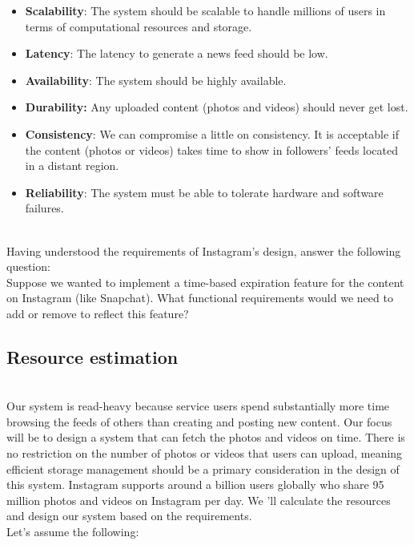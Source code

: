 \begin{itemize}
\item
\protect{}\label{AerSNzIcYi7g0HI8k8qSz}
\textbf{Scalability}: The system should be scalable to handle millions of users in terms of computational resources and storage.
\item
\protect{}\label{2gZnFLVeYoYKoP2acvUg8}
\textbf{Latency}: The latency to generate a news feed should be low.
\item
\protect{}\label{rfOLgCCbljgzBwVyt8UX6}
\textbf{Availability}: The system should be highly available.
\item
\protect{}\label{RCftGo3yz7HjSTanviJsX}
\textbf{Durability:} Any uploaded content (photos and videos) should never get lost.
\item
\protect{}\label{z8PcHlUQTZBnFVjAWb63h}
\textbf{Consistency}: We can compromise a little on consistency. It is acceptable if the content (photos or videos) takes time to show in followers' feeds located in a distant region.
\item
\protect{}\label{U1LsE6Zue7VMyZa_13KQH}
\textbf{Reliability}: The system must be able to tolerate hardware and software failures.
\end{itemize}
\\
Having understood the requirements of Instagram's design, answer the following question:
\\
Suppose we wanted to implement a time-based expiration feature for the content on Instagram (like Snapchat). What functional requirements would we need to add or remove to reflect this feature?


\subsection{Resource estimation}\label{-68ehRtT_DQWsp_6kYACH}
\\
Our system is read-heavy because service users spend substantially more time browsing the feeds of others than creating and posting new content. Our focus will be to design a system that can fetch the photos and videos on time. There is no restriction on the number of photos or videos that users can upload, meaning efficient storage management should be a primary consideration in the design of this system. Instagram supports around a billion users globally who share 95 million photos and videos on Instagram per day. We 'll calculate the resources and design our system based on the requirements.
\\
Let's assume the following:

